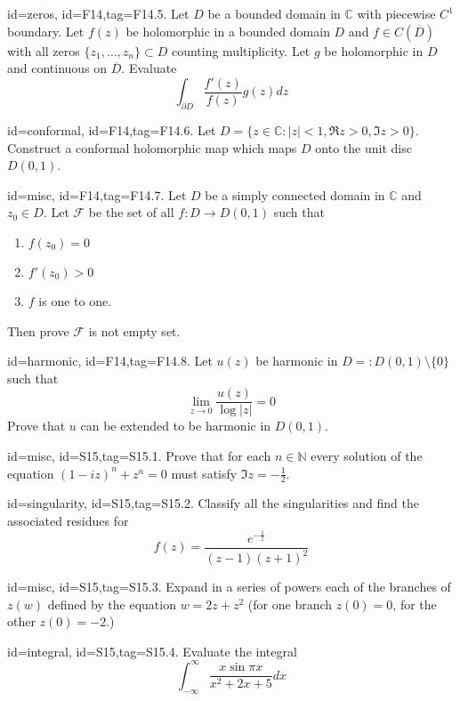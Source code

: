 \documentclass[12pt,letterpaper]{article}
\begin{document}
{\item[id=zeros, id=F14,tag=F14.5.]
Let $D$ be a bounded domain in $\mathbb{C}$ with piecewise $C^1$ boundary. Let $f(z)$ be holomorphic in a bounded domain $D$ and $f\in C(\overline{D})$ with all zeros $\{z_1,\ldots, z_n\} \subset D$ counting multiplicity. Let $g$ be holomorphic in $D$ and continuous on $\overline{D}$. Evaluate
\[
	\int_{\partial D} \frac{f'(z)}{f(z)} g(z) dz
\]
\item[id=conformal, id=F14,tag=F14.6.]
Let $D = \{z \in \mathbb{C} \colon | z | < 1, \Re z > 0, \Im z > 0\}$. Construct a conformal holomorphic map which maps $D$ onto the unit disc $D(0,1)$.

\item[id=misc, id=F14,tag=F14.7.]
Let $D$ be a simply connected domain in $\mathbb{C}$ and $z_0 \in D$. Let $\mathcal{F}$ be the set of all $f : D \rightarrow D(0,1)$ such that
\begin{enumerate}[label=(\roman*)]\onlyitems
\item $f(z_0) = 0$
\item $f'(z_0) > 0$
\item $f$ is one to one.
\end{enumerate}
Then prove $\mathcal{F}$ is not empty set.

\item[id=harmonic, id=F14,tag=F14.8.]
Let $u(z)$ be harmonic in $D =: D(0,1) \setminus \{0\}$ such that
\[
	\lim_{z\rightarrow 0} \frac{u(z)}{\log | z |} = 0
\]
Prove that $u$ can be extended to be harmonic in $D(0,1)$.


\item[id=misc, id=S15,tag=S15.1.]
Prove that for each $n \in \mathbb{N}$ every solution of the equation $(1-iz)^n + z^n = 0$ must satisfy $\Im z = -\frac{1}{2}.$
\item[id=singularity, id=S15,tag=S15.2.]
Classify all the singularities and find the associated residues for
\[
	f(z) = \frac{e^{-\frac{1}{z}}}{(z-1)(z+1)^2}
\]

\item[id=misc, id=S15,tag=S15.3.]
Expand in a series of powers each of the branches of $z(w)$ defined by the equation $w = 2z + z^2$ (for one branch $z(0) = 0$, for the other $z(0) = -2$.)

\item[id=integral, id=S15,tag=S15.4.]
Evaluate the integral
\[
	\int_{-\infty}^{\infty} \frac{x \sin \pi x}{x^2 + 2x + 5} dx
\]

}
\end{document}
